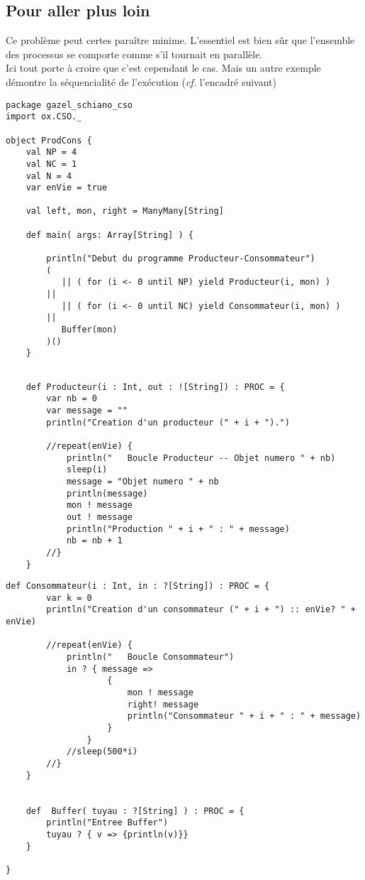 \documentclass[a4paper,11pt,french]{report}
\begin{document}
\subsection{Pour aller plus loin}

Ce problème peut certes paraître minime. L'essentiel est bien sûr que l'ensemble des processus se comporte comme s'il tournait en parallèle.\\ Ici tout porte à croire que c'est cependant le cas. Mais un autre exemple démontre la séquencialité de l'exécution (\emph{cf.} l'encadré suivant)

\begin{lstlisting}[frame=trBL, title={Contre-exemple démontrant la séquentialité de l'exécution}]
package gazel_schiano_cso
import ox.CSO._

object ProdCons {
    val NP = 4
    val NC = 1
    val N = 4
    var enVie = true

    val left, mon, right = ManyMany[String]

    def main( args: Array[String] ) {
        
        println("Debut du programme Producteur-Consommateur")
        ( 
           || ( for (i <- 0 until NP) yield Producteur(i, mon) )
        || 
           || ( for (i <- 0 until NC) yield Consommateur(i, mon) )
        || 
           Buffer(mon) 
        )()
    }
\end{lstlisting}
\begin{lstlisting}[frame=trBL, title={Contre-exemple, suite : Producteur}, firstnumber=last]    
    
    def Producteur(i : Int, out : ![String]) : PROC = {
        var nb = 0
        var message = ""
        println("Creation d'un producteur (" + i + ").")
        
        //repeat(enVie) {
            println("   Boucle Producteur -- Objet numero " + nb)
            sleep(i)
            message = "Objet numero " + nb
            println(message)
            mon ! message
            out ! message
            println("Production " + i + " : " + message)
            nb = nb + 1
        //}
    }
\end{lstlisting}
\begin{lstlisting}[frame=trBL, title={Contre-exemple, suite : Consommateur et Buffer}, firstnumber=last]
    def Consommateur(i : Int, in : ?[String]) : PROC = {
        var k = 0
        println("Creation d'un consommateur (" + i + ") :: enVie? " + enVie)
        
        //repeat(enVie) {
            println("   Boucle Consommateur")
            in ? { message => 
                    {
                        mon ! message 
                        right! message 
                        println("Consommateur " + i + " : " + message)
                    } 
                }
            //sleep(500*i)
        //}
    }  
    

    def  Buffer( tuyau : ?[String] ) : PROC = {
        println("Entree Buffer")
        tuyau ? { v => {println(v)}}
    }
    
}
\end{lstlisting}
\end{document}
